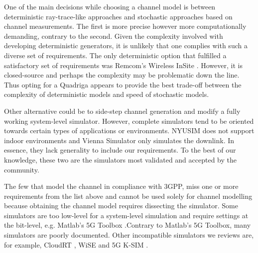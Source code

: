 One of the main decisions while choosing a channel model is between deterministic ray-trace-like approaches and stochastic approaches based on channel measurements. The first is more precise however more computationally demanding, contrary to the second. Given the complexity involved with developing deterministic generators, it is unlikely that one complies with such a diverse set of requirements. The only deterministic option that fulfilled a satisfactory set of requirements was Remcom's Wireless InSite \cite{remcom}. However, it is closed-source and perhaps the complexity may be problematic down the line. Thus opting for a \ac{Quadriga} appears to provide the best trade-off between the complexity of deterministic models and speed of stochastic models.


Other alternative could be to side-step channel generation and modify a fully working system-level simulator. However, complete simulators tend to be oriented towards certain types of applications or environments. NYUSIM \cite{nyusim} does not support indoor environments and Vienna Simulator \cite{Vienna5GSLS} only simulates the downlink. In essence, they lack generality to include our requirements. To the best of our knowledge, these two are the simulators most validated and accepted by the community.

The few that model the channel in compliance with 3GPP, miss one or more requirements from the list above and cannot be used solely for channel modelling because obtaining the channel model requires dissecting the simulator. Some simulators are too low-level for a system-level simulation and require settings at the bit-level, e.g. Matlab's 5G Toolbox \cite{5G_toolbox}.Contrary to Matlab's 5G Toolbox, many simulators are poorly documented. Other incompatible simulators we reviews are, for example, CloudRT \cite{cloudRT}, WiSE \cite{wise} and 5G K-SIM \cite{8610404}.




